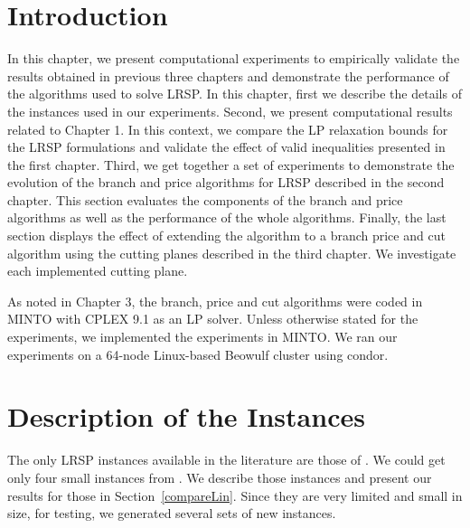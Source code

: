
\section{Introduction}
In this chapter, we present  computational experiments to empirically
validate the results obtained in previous three chapters and demonstrate the
performance of the algorithms used to solve LRSP. In this chapter, first we
describe the details of the instances used in our experiments. Second, we
present computational results related to Chapter 1. In this context, we compare
the LP relaxation bounds for the LRSP formulations and validate the effect of
valid inequalities presented in the first chapter. Third, we get together a set of
experiments to demonstrate the evolution of the branch and price algorithms for
LRSP described in the second chapter. This section evaluates the components of
the branch and price algorithms as well as the performance of the whole algorithms.
Finally, the last section displays the effect of extending the algorithm to a branch
price and cut algorithm using the cutting planes described in the third chapter.
We investigate each implemented cutting plane.

As noted in Chapter 3, the branch, price and cut algorithms were coded in MINTO with
CPLEX 9.1 as an LP solver. Unless otherwise stated for the experiments, we implemented
the experiments in MINTO.  We ran our experiments on a
64-node Linux-based Beowulf cluster using condor.


\section{Description of the Instances}
\label{instances}

The only LRSP instances available in the literature are those of \citet{Lin}.
We could get only four small instances from \citet{Lin}. We describe those instances
and present our results for those  in Section~\ref{compareLin}.
Since they are very limited and small in size, for testing, we generated several sets
of new instances.

